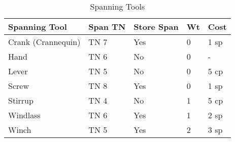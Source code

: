 \documentclass[oneside,11pt,english]{book}
\begin{document}
\begin{table}
	\centering
	\caption{Spanning Tools}
	\label{tab:Spanning Tools}
	\begin{tabu} spread 0pt {X *{2}{X[-1,c]} *{2}{X[-2,c]}}
		\rowfont[c]{}Spanning Tool & Span TN & Store Span & Wt & Cost \\ \toprule
		Crank (Crannequin)         & TN 7    & Yes        & 0  & 1 sp \\
		Hand                       & TN 6    & No         & 0  & -    \\
		Lever                      & TN 5    & No         & 0  & 5 cp \\
		Screw                      & TN 8    & Yes        & 0  & 1 sp \\
		Stirrup                    & TN 4    & No         & 1  & 5 cp \\
		Windlass                   & TN 6    & Yes        & 1  & 2 sp \\
		Winch                      & TN 5    & Yes        & 2  & 3 sp
	\end{tabu}
\end{table}
\end{document}
